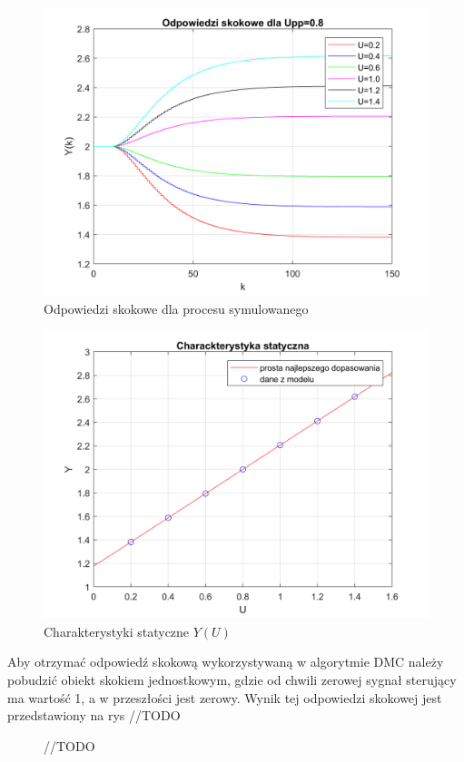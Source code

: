 \begin{figure}
\label{os}
\centering
\caption{Odpowiedzi skokowe dla procesu symulowanego}
\includegraphics{odpsk.png}
\end{figure}

\begin{figure}
\label{char_stat}
\centering
\caption{Charakterystyki statyczne $Y(U)$}
\includegraphics{static_characteristics.png}
\end{figure}

Aby otrzymać odpowiedź skokową wykorzystywaną w algorytmie DMC należy pobudzić obiekt skokiem jednostkowym, gdzie od chwili zerowej sygnał sterujący ma wartość 1, a w przeszłości jest zerowy. Wynik tej odpowiedzi skokowej jest przedstawiony na rys //TODO
\begin{figure}
	//TODO
\end{figure}

